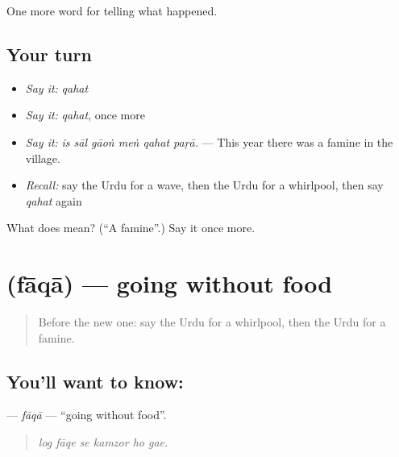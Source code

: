 \begin{grammarlens}[title={What you've built}]
One more word for telling what happened.
\end{grammarlens}

\subsection*{Your turn}
\begin{itemize}
\raggedright
  \item \emph{Say it:} \emph{qahat}
  \item \emph{Say it:} \emph{qahat}, once more
  \item \emph{Say it:} \emph{is sāl gāoṅ meṅ qahat paṛā.} — This year there was a famine in the village.
  \item \emph{Recall:} say the Urdu for a wave, then the Urdu for a whirlpool, then say \emph{qahat} again
\end{itemize}

\begin{tcolorbox}[breakable,colback=teal!4,colframe=teal!35!black,title={Before you move on}]
What does  mean? (\textquotedblleft{}A famine\textquotedblright{}.) Say it once more.
\end{tcolorbox}
\section[\texorpdfstring{\ur{فاقہ} (fāqā)}{فاقہ (fāqā)}]{ (fāqā) — going without food}

\label{lesson:UR-C294-faqa}



\begin{quote}
Before the new one: say the Urdu for a whirlpool, then the Urdu for a famine.
\end{quote}

\subsection*{You'll want to know: }
\textbf{} — \emph{fāqā} — \textquotedblleft{}going without food\textquotedblright{}.

\begin{quote}
     
\end{quote}

\begin{quote}
\emph{log fāqe se kamzor ho gae.}
\end{quote}

